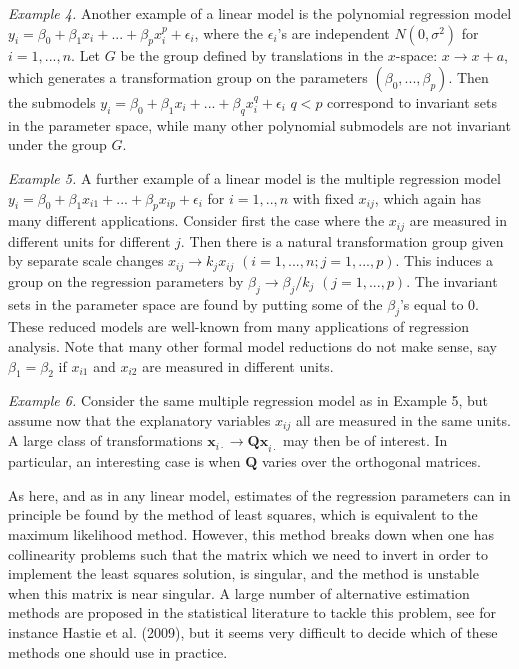 \documentclass[11pt]{article}
\begin{document}
\textit{Example 4.} Another example of a linear model is the polynomial regression model $y_i =\beta_0 + \beta_1 x_i +...+\beta_p x_{i}^p +\epsilon_i$, 
where the $\epsilon_i$'s are independent $N(0,\sigma ^2)$ for $i=1,...,n$. Let $G$ be the group defined by translations in the $x$-space: $x\rightarrow x+a$, 
which generates a transformation group on the parameters $(\beta_0 ,...,\beta_p )$. Then the submodels 
$y_i =\beta_0 + \beta_1 x_i +...+\beta_q x_{i}^q +\epsilon_i$ $q<p$ correspond to invariant sets in the parameter space, while many other polynomial submodels are not invariant under the group $G$. 
\bigskip

\textit{Example 5.} A further example of a linear model is the multiple regression model $y_i = \beta_0 +\beta_1 x_{i1}+...+\beta_p x_{ip} +\epsilon_i $ 
for $i=1,..,n$ with fixed $x_{ij}$, which again has many different applications. Consider first the case where the $x_{ij}$ are measured in different units for 
different $j$. Then there is a natural transformation group given by separate scale changes $x_{ij}\rightarrow k_j x_{ij}$ $(i=1,...,n; j=1,...,p)$. This induces a 
group on the regression parameters by $\beta_j \rightarrow \beta_j /k_j $ $(j=1,...,p)$. The invariant sets in the parameter space are found by putting 
some of the $\beta_j$'s equal to $0$. These reduced models are well-known from many applications of regression analysis. Note that many other formal model reductions do not make sense, say $\beta_1=\beta_2$ if $x_{i1}$ and $x_{i2}$ are measured in different units.
\bigskip

\textit{Example 6.} Consider the same multiple regression model as in Example 5, but assume now that the explanatory variables $x_{ij}$ all are measured 
in the same units. A large class of transformations $\bm{x}_{i\cdot}\rightarrow \bm{Qx}_{i\cdot}$ may then be of interest. In particular, an interesting 
case is when $\bm{Q}$ varies over the orthogonal matrices.

 As here, and as in any linear model, estimates of the regression parameters can in principle be found by the method of least squares, which is equivalent to 
the maximum likelihood method. However, this method breaks down when one has collinearity problems such that the matrix 
which we need to invert in order to implement the least squares solution, is singular, and the method is unstable when this matrix is near singular. A large number of alternative estimation methods are proposed in the 
statistical literature to tackle this problem, see for instance Hastie et al. (2009), but it seems very difficult to decide which of these methods one should use in practice.
 
\end{document}
